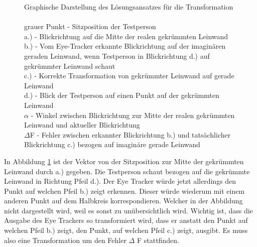 \begin{figure}
\begin{center}
		\caption{Graphische Darstellung des Lösungsansatzes für die Transformation\\\\
		\footnotesize grauer Punkt - Sitzposition der Testperson\\
		a.) - Blickrichtung auf die Mitte der realen gekrümmten Leinwand\\
		b.) - Vom Eye-Tracker erkannte Blickrichtung auf der imaginären geraden Leinwand, wenn Testperson in Blickrichtung d.) auf gekrümmter Leinwand schaut\\
		c.) - Korrekte Transformation von gekrümmter Leinwand auf gerade Leinwand\\
		d.) - Blick der Testperson auf einen Punkt auf der gekrümmten Leinwand\\
		$\alpha$ - Winkel zwischen Blickrichtung zur Mitte der realen gekrümmten Leinwand und aktueller Blickrichtung\\
		$\Delta$F - Fehler zwischen erkannter Blickrichtung b.) und tatsächlicher Blickrichtung c.) bezogen auf imaginäre gerade Leinwand
		} \label{fig:kruemmungsproblem_4}
	\end{center}
\end{figure}

In Abbildung \ref{fig:kruemmungsproblem_4} ist der Vektor von der Sitzposition zur Mitte der gekrümmten Leinwand durch a.) gegeben. Die Testperson schaut bezogen auf die gekrümmte Leinwand in Richtung Pfeil d.). Der Eye Tracker würde jetzt allerdings den Punkt auf welchen Pfeil b.) zeigt erkennen. Dieser würde wiederum mit einem anderen Punkt auf dem Halbkreis korrespondieren. Welcher in der Abbildung nicht dargestellt wird, weil es sonst zu unübersichtlich wird. Wichtig ist, dass die Ausgabe des Eye Trackers so transformiert wird, dass er anstatt den Punkt auf welchen Pfeil b.) zeigt, den Punkt, auf welchen Pfeil c.) zeigt, ausgibt. Es muss also eine Transformation um den Fehler $\Delta$ F stattfinden.


